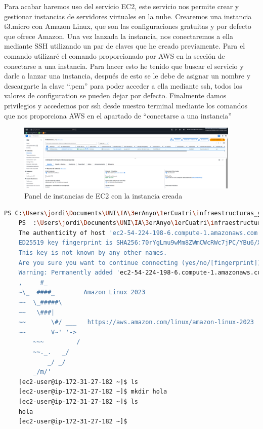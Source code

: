 \documentclass{article}
\begin{document}
	Para acabar haremos uso del servicio EC2, este servicio nos permite crear y gestionar instancias de servidores virtuales en la nube. Crearemos una instancia t3.micro con Amazon Linux, que son las configuraciones gratuitas y por defecto que ofrece Amazon. Una vez lanzada la instancia, nos conectaremos a ella mediante SSH utilizando un par de claves que he creado previamente. Para el comando utilizaré el comando proporcionado por AWS en la sección de conectarse a una instancia. Para hacer esto he tenido que buscar el servicio y darle a lanzar una instancia, después de esto se le debe de asignar un nombre y descargarte la clave ``.pem'' para poder acceder a ella mediante ssh, todos los valores de configuration se pueden dejar por defecto. Finalmente damos privilegios y accedemos por ssh desde nuestro terminal mediante los comandos que nos proporciona AWS en el apartado de ``conectarse a una instancia'' 


	\begin{figure}[H]
	\centering
	\includegraphics[width=0.95\textwidth]{tarea_final_1.png}
	\caption{Panel de instancias de EC2 con la instancia creada}
	\end{figure}



\begin{lstlisting}[style=consola, language=bash, caption={Salida de la terminal Windows Power Shell.}]
	PS C:\Users\jordi\Documents\UNI\IA\3erAnyo\1erCuatri\infraestructuras_y_servicios_cloud\practicas\practica_1> chmod 400 "pc.pem"
	PS  :\Users\jordi\Documents\UNI\IA\3erAnyo\1erCuatri\infraestructuras_y_servicios_cloud\practicas\practica_1> ssh -i "pc.pem" ec2-user@ec2-54-224-198-6.compute-1.amazonaws.com
	The authenticity of host 'ec2-54-224-198-6.compute-1.amazonaws.com (54.224.198.6)' can't be established.
	ED25519 key fingerprint is SHA256:70rYgLmu9wMm8ZWmCWcRWc7jPC/YBu6/XO29SwU94qk.
	This key is not known by any other names.
	Are you sure you want to continue connecting (yes/no/[fingerprint])? yes
	Warning: Permanently added 'ec2-54-224-198-6.compute-1.amazonaws.com' (ED25519) to the list of known hosts.
	,     #_
	~\_  ####_        Amazon Linux 2023
	~~  \_#####\
	~~   \###|
	~~       \#/ ___   https://aws.amazon.com/linux/amazon-linux-2023
	~~       V~' '->
		~~~         /
		~~._.   _/
			_/ _/
		_/m/'
	[ec2-user@ip-172-31-27-182 ~]$ ls
	[ec2-user@ip-172-31-27-182 ~]$ mkdir hola
	[ec2-user@ip-172-31-27-182 ~]$ ls
	hola
	[ec2-user@ip-172-31-27-182 ~]$

\end{lstlisting}
\end{document}
